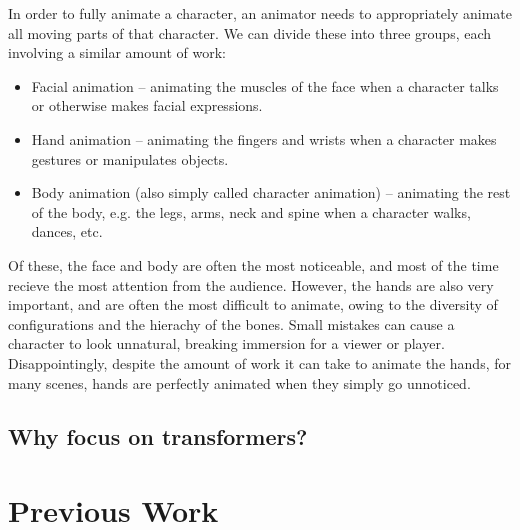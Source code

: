 In order to fully animate a character, an animator needs to appropriately animate all moving parts of that character. We can divide these into three groups, each involving a similar amount of work:
\begin{itemize}
    \item Facial animation -- animating the muscles of the face when a character talks or otherwise makes facial expressions.
    \item Hand animation -- animating the fingers and wrists when a character makes gestures or manipulates objects.
    \item Body animation (also simply called character animation) -- animating the rest of the body, e.g. the legs, arms, neck and spine when a character walks, dances, etc.
\end{itemize}

Of these, the face and body are often the most noticeable, and most of the time recieve the most attention from the audience. However, the hands are also very important, and are often the most difficult to animate, owing to the diversity of configurations and the hierachy of the bones. Small mistakes can cause a character to look unnatural, breaking immersion for a viewer or player. Disappointingly, despite the amount of work it can take to animate the hands, for many scenes, hands are perfectly animated when they simply go unnoticed.


\subsection{Why focus on transformers?}
\label{ss:why-transformers}


\section{Previous Work}
